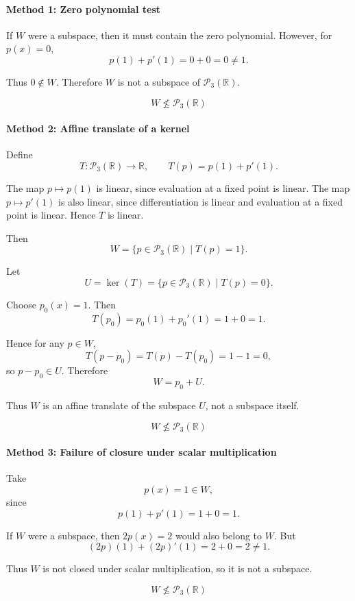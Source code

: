 \documentclass[12pt]{article}
\begin{document}
\paragraph{Method 1: Zero polynomial test}

If \(W\) were a subspace, then it must contain the zero polynomial. However, for \(p(x)=0\),
\[
p(1)+p'(1)=0+0=0\neq1.
\]

Thus \(0\notin W\). Therefore \(W\) is not a subspace of \(\mathcal P_3(\mathbb R)\).

\[
\boxed{W\not\le \mathcal P_3(\mathbb R)}
\]

\paragraph{Method 2: Affine translate of a kernel}

Define
\[
T:\mathcal P_3(\mathbb R)\to\mathbb R,\qquad T(p)=p(1)+p'(1).
\]

The map \(p\mapsto p(1)\) is linear, since evaluation at a fixed point is linear. The map \(p\mapsto p'(1)\) is also linear, since differentiation is linear and evaluation at a fixed point is linear. Hence \(T\) is linear.

Then
\[
W=\{p\in\mathcal P_3(\mathbb R)\mid T(p)=1\}.
\]

Let
\[
U=\ker(T)=\{p\in\mathcal P_3(\mathbb R)\mid T(p)=0\}.
\]

Choose \(p_0(x)=1\). Then
\[
T(p_0)=p_0(1)+p_0'(1)=1+0=1.
\]

Hence for any \(p\in W\),
\[
T(p-p_0)=T(p)-T(p_0)=1-1=0,
\]
so \(p-p_0\in U\). Therefore
\[
W=p_0+U.
\]

Thus \(W\) is an affine translate of the subspace \(U\), not a subspace itself.

\[
\boxed{W\not\le \mathcal P_3(\mathbb R)}
\]

\paragraph{Method 3: Failure of closure under scalar multiplication}

Take
\[
p(x)=1\in W,
\]
since
\[
p(1)+p'(1)=1+0=1.
\]

If \(W\) were a subspace, then \(2p(x)=2\) would also belong to \(W\). But
\[
(2p)(1)+(2p)'(1)=2+0=2\neq1.
\]

Thus \(W\) is not closed under scalar multiplication, so it is not a subspace.

\[
\boxed{W\not\le \mathcal P_3(\mathbb R)}
\]
\end{document}
